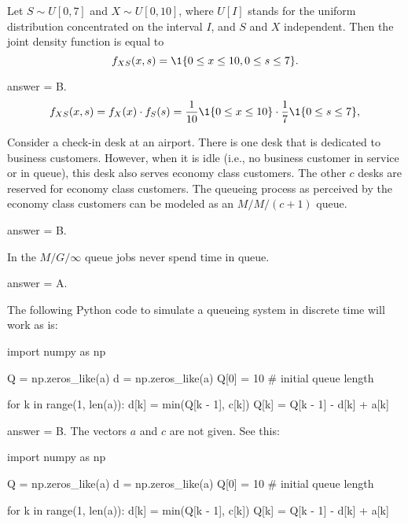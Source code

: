 \begin{exercise}[201902]
  Let $S\sim U[0,7]$ and $X\sim U[0,10]$, where $U[I]$ stands for the
  uniform distribution concentrated on the interval $I$, and $S$ and $X$ independent. Then the joint density function is equal to 
\begin{equation*}
  f_{X S}(x,s) = \1{0\leq x \leq 10, 0\leq s \leq 7}.
\end{equation*}
\begin{solution}
answer = B. %
\begin{equation*}
  f_{X S}(x, s) = f_X(x) \cdot f_S(s) = \frac{1}{10} \1{0\leq x \leq 10}\cdot \frac 17 \1{0\leq s \leq 7},
\end{equation*}

\end{solution}
\end{exercise}

\begin{exercise}[201902]
Consider a check-in desk at an airport. There is one desk that is dedicated to  business customers. However, when it is idle (i.e., no business customer in service or in queue), this desk also serves economy class customers. The other $c$ desks are reserved for economy class customers. The queueing process as perceived by the economy class customers can be modeled as an $M/M/(c+1)$ queue. 
\begin{solution}
answer = B. 
\end{solution}
\end{exercise}

\begin{exercise}[201902]
In the $M/G/\infty$ queue jobs never spend time in queue.
\begin{solution}
answer = A.
\end{solution}
\end{exercise}

\begin{exercise}[201902]
The following Python code to simulate a queueing system in discrete time will work as is: 


\begin{pyverbatim}
import numpy as np

Q = np.zeros_like(a)
d = np.zeros_like(a)
Q[0] = 10  # initial queue length

for k in range(1, len(a)):
    d[k] = min(Q[k - 1], c[k])
    Q[k] = Q[k - 1] - d[k] + a[k]

\end{pyverbatim}

\begin{solution}
  answer = B. The vectors $a$ and $c$ are not given. See this:

\begin{pyconsole}
import numpy as np

Q = np.zeros_like(a)
d = np.zeros_like(a)
Q[0] = 10  # initial queue length

for k in range(1, len(a)):
    d[k] = min(Q[k - 1], c[k])
    Q[k] = Q[k - 1] - d[k] + a[k]

\end{pyconsole}
  
\end{solution}
\end{exercise}

